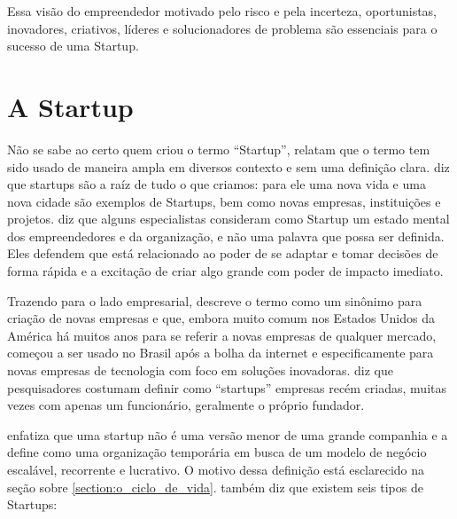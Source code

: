 Essa visão do empreendedor motivado pelo risco e pela incerteza, oportunistas, inovadores, criativos, líderes e solucionadores de problema são essenciais para o sucesso de uma Startup.

\section{A Startup}
\label{section:as_startups}

Não se sabe ao certo quem criou o termo ``Startup'',  relatam que o termo tem sido usado de maneira ampla em diversos contexto e sem uma definição clara.  diz que startups são a raíz de tudo o que criamos: para ele uma nova vida e uma nova cidade são exemplos de Startups, bem como novas empresas, instituições e projetos.  diz que alguns especialistas consideram como Startup um estado mental dos empreendedores e da organização, e não uma palavra que possa ser definida. Eles defendem que está relacionado ao poder de se adaptar e tomar decisões de forma rápida e a excitação de criar algo grande com poder de impacto imediato.

Trazendo para o lado empresarial,  descreve o termo como um sinônimo para criação de novas empresas e que, embora muito comum nos Estados Unidos da América há muitos anos para se referir a novas empresas de qualquer mercado, começou a ser usado no Brasil após a bolha da internet e especificamente para novas empresas de tecnologia com foco em soluções inovadoras.  diz que pesquisadores costumam definir como ``startups'' empresas recém criadas, muitas vezes com apenas um funcionário, geralmente o próprio fundador.

 enfatiza que uma startup não é uma versão menor de uma grande companhia e a define como uma organização temporária em busca de um modelo de negócio escalável, recorrente e lucrativo. O motivo dessa definição está esclarecido na seção sobre \ref{section:o_ciclo_de_vida}.  também  diz que existem seis tipos de Startups: 

